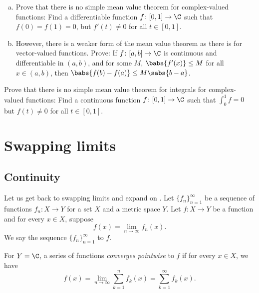 \begin{exercise}
\leavevmode
\begin{enumerate}[a)]
\item
Prove that there is no simple mean value theorem for complex-valued
functions:  Find a differentiable function $f \colon [0,1] \to \C$ such that
$f(0) = f(1) = 0$, but $f'(t) \not= 0$ for all $t \in [0,1]$.
\item
However, there is a weaker form of the mean value theorem as there is for vector-valued
functions.  Prove: If $f \colon [a,b] \to \C$ is continuous and differentiable in
$(a,b)$, and for some $M$, $\babs{f'(x)} \leq M$ for all $x \in (a,b)$, then
$\babs{f(b)-f(a)} \leq M \sabs{b-a}$.
\end{enumerate}
\end{exercise}

\begin{exercise}
Prove that there is no simple mean value theorem for integrals
for complex-valued
functions:  Find a continuous function $f \colon [0,1] \to \C$ such that
$\int_0^1 f = 0$ but $f(t) \not= 0$ for all $t \in [0,1]$.
\end{exercise}



\sectionnewpage
\section{Swapping limits}
\label{sec:swaplim}



\subsection{Continuity}

Let us get back to swapping limits and expand on
.
Let $\{ f_n \}_{n=1}^\infty$ be a sequence
of functions $f_n \colon X \to Y$ for a set $X$ and a metric space $Y$.
Let $f \colon X \to Y$ be a
function and for every $x \in X$, suppose
\begin{equation*}
f(x) = \lim_{n\to \infty} f_n(x) .
\end{equation*}
We say the sequence $\{ f_n \}_{n=1}^\infty$
\emph{} to $f$.

For $Y=\C$, a series of functions
\emph{converges pointwise} to $f$ if
for every $x \in X$, we have
\begin{equation*}
f(x) = \lim_{n\to \infty} \sum_{k=1}^n f_k(x) =
\sum_{k=1}^\infty f_k(x) .
\end{equation*}

